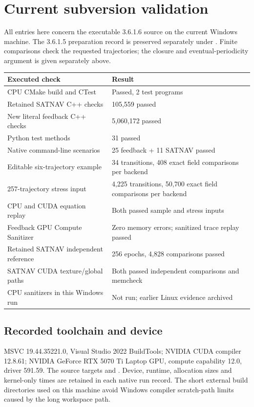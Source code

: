 \section{Current subversion validation}
All entries here concern the executable 3.6.1.6 source on the current Windows
machine. The 3.6.1.5 preparation record is preserved separately under
. Finite comparisons check the requested trajectories;
the closure and eventual-periodicity argument is given separately above.

\begin{center}
\begin{tabularx}{\textwidth}{@{}P{.53\textwidth}Y@{}}\toprule
\textbf{Executed check} & \textbf{Result}\\\midrule
CPU CMake build and CTest & Passed, 2 test programs\\
Retained SATNAV C++ checks & 105,559 passed\\
New literal feedback C++ checks & 5,060,172 passed\\
Python test methods & 31 passed\\
Native command-line scenarios & 25 feedback + 11 SATNAV passed\\
Editable six-trajectory example & 34 transitions, 408 exact field comparisons per backend\\
257-trajectory stress input & 4,225 transitions, 50,700 exact field comparisons per backend\\
CPU and CUDA equation replay & Both passed sample and stress inputs\\
Feedback GPU Compute Sanitizer & Zero memory errors; sanitized trace replay passed\\
Retained SATNAV independent reference & 256 epochs, 4,828 comparisons passed\\
SATNAV CUDA texture/global paths & Both passed independent comparisons and memcheck\\
CPU sanitizers in this Windows run & Not run; earlier Linux evidence archived\\\bottomrule
\end{tabularx}
\end{center}

\subsection{Recorded toolchain and device}
MSVC 19.44.35221.0, Visual Studio 2022 BuildTools; NVIDIA CUDA compiler 12.8.61;
NVIDIA GeForce RTX 5070 Ti Laptop GPU, compute capability 12.0, driver 591.59.
The source targets  and . Device, runtime,
allocation sizes and kernel-only times are retained in each native run record.
The short external build directories used on this machine avoid Windows compiler
scratch-path limits caused by the long workspace path.

